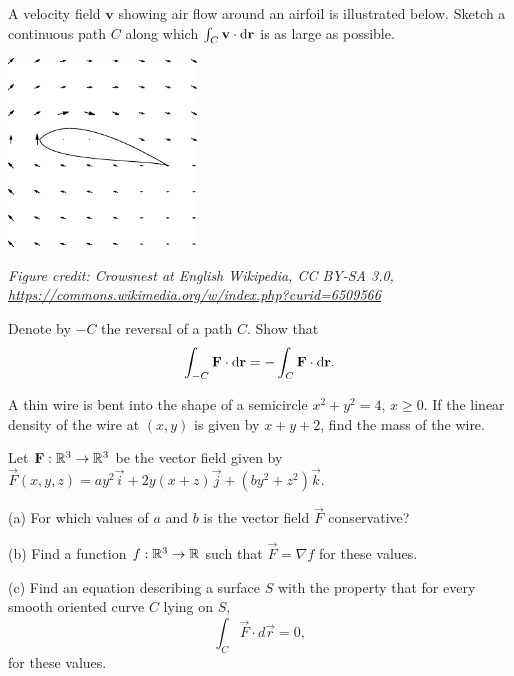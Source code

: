 \documentclass{watsonbook}
\begin{document}
\begin{aexercise}
  A velocity field $\mathbf{v}$ showing air flow around an airfoil is
  illustrated below. Sketch a continuous path $C$ along which
  $\int_C \mathbf{v} \cdot \mathrm{d}\mathbf{r}$ is as large as possible. 
  \begin{center}
    \includegraphics[width=5cm]{exercisefigures/airfoil}
  \end{center}
\textit{\tiny Figure credit: Crowsnest at English Wikipedia, CC BY-SA 3.0, \url{https://commons.wikimedia.org/w/index.php?curid=6509566}}
\end{aexercise}

\begin{aexercise}
  Denote by $-C$ the reversal of a path $C$. Show that 
  \[
  \int_{-C} \mathbf{F} \cdot \mathrm{d}\mathbf{r} = -\int_{C}\mathbf{F}
  \cdot \mathrm{d}\mathbf{r}. 
  \]
\end{aexercise}


\begin{aexercise}
  A thin wire is bent into the shape of a semicircle $x^2 + y^2 = 4$,
  $x \geq 0$. If the linear density of the wire at $(x,y)$ is given by
  $x+y+2$, find the mass of the wire. 
\end{aexercise}

\begin{aexercise}
  Let $\mathbf{F}:\mathbb{R}^3 \to \mathbb{R}^3$ be the vector field given by
  $\vec{F}(x,y,z)=ay^2\vec{i}+2y(x+z)\vec{j}+(by^2 +z^2)\vec{k}$.

  (a) For which values of $a$ and $b$ is the vector field $\vec{F}$
  conservative?

  (b) Find a function $f:\mathbb{R}^3 \to \mathbb{R}$ such that $\vec{F} = \nabla f$
  for these values.

  (c) Find an equation describing a surface $S$ with the property that
  for every smooth oriented curve $C$ lying on $S$,
  \[
    \int_C \vec{F}\cdot d\vec{r} = 0,
  \]
  for these values.
\end{aexercise}
\end{document}

